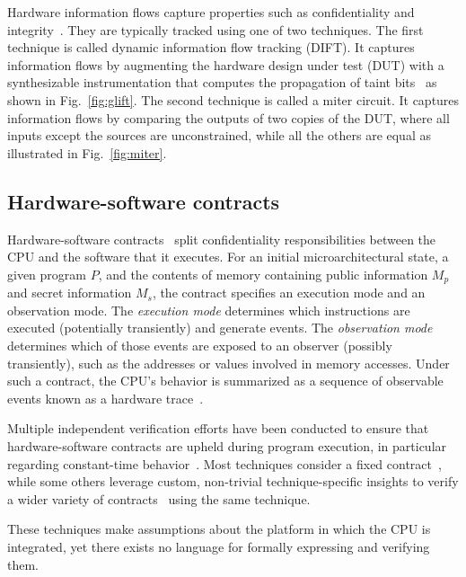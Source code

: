 Hardware information flows capture properties such as confidentiality and integrity~\cite{hu2021hardware}.
They are typically tracked using one of two techniques.
The first technique is called dynamic information flow tracking (DIFT).
It captures information flows by augmenting the hardware design under test (DUT) with a synthesizable instrumentation that computes the propagation of taint bits~\cite{tiwari2009complete,ardeshiricham2017register,solt2022cellift,solt2024hybridift,ceesay2024mucfi} as shown in Fig.~\ref{fig:glift}.
The second technique is called a miter circuit.
It captures information flows by comparing the outputs of two copies of the DUT, where all inputs except the sources are unconstrained, while all the others are equal as illustrated in Fig.~\ref{fig:miter}.

\subsection{Hardware-software contracts}
\label{subsec:hw-sw-contracts}

Hardware-software contracts~\cite{guarnieri2021hardware} split confidentiality responsibilities between the CPU and the software that it executes.
For an initial microarchitectural state, a given program $P$, and the contents of memory containing public information $M_p$ and secret information $M_s$, the contract specifies an execution mode and an observation mode.
The \emph{execution mode} determines which instructions are executed (potentially transiently) and generate events.
The \emph{observation mode} determines which of those events are exposed to an observer (possibly transiently), such as the addresses or values involved in memory accesses.
Under such a contract, the CPU's behavior is summarized as a sequence of observable events known as a hardware trace~\cite{guarnieri2021hardware,oleksenko2022revizor}.

Multiple independent verification efforts have been conducted to ensure that hardware-software contracts are upheld during program execution, in particular regarding constant-time behavior~\cite{dinesh2024conjunct,ceesay2024mucfi,guarnieri2021hardware,tan2025contractshadowlogic,dinesh2025h,hsiao2024rtl2mmupath,wang2023specification}.
Most techniques consider a fixed contract~\cite{dinesh2024conjunct,ceesay2024mucfi,tan2025contractshadowlogic,dinesh2025h}, while some others leverage custom, non-trivial technique-specific insights to verify a wider variety of contracts~\cite{hsiao2024rtl2mmupath,wang2023specification} using the same technique.

These techniques make assumptions about the platform in which the CPU is integrated, yet there exists no language for formally expressing and verifying them.
